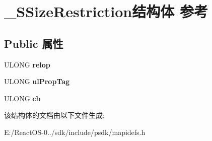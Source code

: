 \hypertarget{struct___s_size_restriction}{}\section{\+\_\+\+S\+Size\+Restriction结构体 参考}
\label{struct___s_size_restriction}
\subsection*{Public 属性}
\begin{DoxyCompactItemize}
\item 
\mbox{\label{struct___s_size_restriction_a25d55c3d26a2ef4f0684cd5c7b01ab68}} 
U\+L\+O\+NG {\bfseries relop}
\item 
\mbox{\label{struct___s_size_restriction_a2a54c0bd4ec6d99325cf0edb2157feee}} 
U\+L\+O\+NG {\bfseries ul\+Prop\+Tag}
\item 
\mbox{\label{struct___s_size_restriction_a69080f7b6dd80c5a5346a428677f4d42}} 
U\+L\+O\+NG {\bfseries cb}
\end{DoxyCompactItemize}


该结构体的文档由以下文件生成\+:\begin{DoxyCompactItemize}
\item 
E\+:/\+React\+O\+S-\/0../sdk/include/psdk/mapidefs.\+h\end{DoxyCompactItemize}
